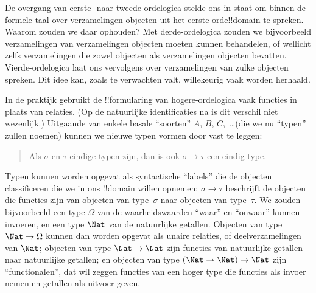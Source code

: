 \documentclass[../../../include/open-logic-section]{subfiles}
\begin{document}


De overgang van eerste- naar tweede-ordelogica stelde ons in staat om binnen
de formele taal over verzamelingen objecten uit het eerste-orde!!{domain} te
spreken. Waarom zouden we daar ophouden? Met derde-ordelogica zouden we
bijvoorbeeld verzamelingen van verzamelingen objecten moeten kunnen
behandelen, of wellicht zelfs verzamelingen die zowel objecten als
verzamelingen objecten bevatten. Vierde-ordelogica laat ons vervolgens over
verzamelingen van zulke objecten spreken. Dit idee kan, zoals te verwachten
valt, willekeurig vaak worden herhaald.

In de praktijk gebruikt de !!{formula}ring van hogere-ordelogica vaak functies
in plaats van relaties. (Op de natuurlijke identificaties na is dit verschil
niet wezenlijk.) Uitgaande van enkele basale ``soorten'' $A$, $B$,
$C$,~\dots (die we nu ``typen'' zullen noemen) kunnen we nieuwe typen vormen
door vast te leggen:
\begin{quote}
Als $\sigma$ en $\tau$ eindige typen zijn, dan is ook $\sigma \to \tau$ een
eindig type.
\end{quote}
Typen kunnen worden opgevat als syntactische ``labels'' die de objecten
classificeren die we in ons !!{domain} willen opnemen; $\sigma \to \tau$
beschrijft de objecten die functies zijn van objecten van type~$\sigma$ naar
objecten van type~$\tau$. We zouden bijvoorbeeld een type $\Omega$ van de
waarheidswaarden ``waar'' en ``onwaar'' kunnen invoeren, en een type $\Nat$ van
de natuurlijke getallen. Objecten van type $\Nat \to \Omega$ kunnen dan worden
opgevat als unaire relaties, of deelverzamelingen van $\Nat$; objecten van type
$\Nat \to \Nat$ zijn functies van natuurlijke getallen naar natuurlijke
getallen; en objecten van type $(\Nat \to \Nat) \to \Nat$ zijn
``functionalen'', dat wil zeggen functies van een hoger type die functies als
invoer nemen en getallen als uitvoer geven.
\end{document}
